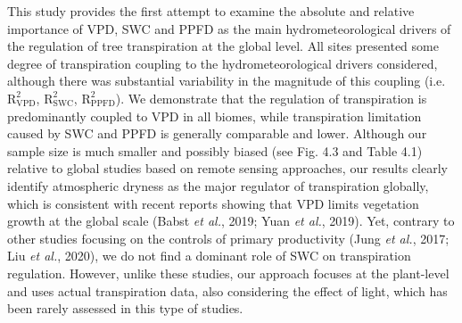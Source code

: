 \documentclass[11pt,twoside]{reedthesis}
\begin{document}
This study provides the first attempt to examine the absolute and
relative importance of VPD, SWC and PPFD as the main hydrometeorological
drivers of the regulation of tree transpiration at the global level. All
sites presented some degree of transpiration coupling to the
hydrometeorological drivers considered, although there was substantial
variability in the magnitude of this coupling (i.e.
\(\text{R}^2_{\text{VPD}}\), \(\text{R}^2_{\text{SWC}}\),
\(\text{R}^2_{\text{PPFD}}\)). We demonstrate that the regulation of
transpiration is predominantly coupled to VPD in all biomes, while
transpiration limitation caused by SWC and PPFD is generally comparable
and lower. Although our sample size is much smaller and possibly biased
(see Fig. 4.3 and Table 4.1) relative to global studies based on remote
sensing approaches, our results clearly identify atmospheric dryness as
the major regulator of transpiration globally, which is consistent with
recent reports showing that VPD limits vegetation growth at the global
scale (Babst \emph{et al.}, 2019; Yuan \emph{et al.}, 2019). Yet,
contrary to other studies focusing on the controls of primary
productivity (Jung \emph{et al.}, 2017; Liu \emph{et al.}, 2020), we do
not find a dominant role of SWC on transpiration regulation. However,
unlike these studies, our approach focuses at the plant-level and uses
actual transpiration data, also considering the effect of light, which
has been rarely assessed in this type of studies.\par
\end{document}
